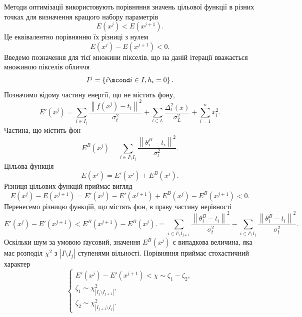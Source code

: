 Методи оптимізації використовують порівняння
значень цільової функції в різних точках
для визначення кращого набору параметрів
\begin{equation*}
  E\left( x^j \right) < E\left( x^{j+1} \right).
\end{equation*}
Це еквівалентно порівнянню їх різниці з нулем
\begin{equation*}
  E\left( x^j \right) - E\left( x^{j+1} \right) < 0.
\end{equation*}
Введемо позначення для тієї множини пікселів,
що на даній ітерації вважається множиною пікселів обличчя
\begin{equation*}
  I^j = \left\{ i \mcond i \in I, h_i = 0 \right\}.
\end{equation*}
Позначимо відому частину енергії, що не містить фону,
\begin{equation*}
  E'\left( x^j \right)
  = \sum_{i \in I_j} \frac{\left\| f\left( x^j \right) - t_i \right\|^2}{\sigma^2_t}
    + \sum_{l \in L} \frac{\Delta_l^2\left( x \right)}{\sigma_L^2}
    + \sum_{i = 1}^n x_i^2.
\end{equation*}
Частина, що містить фон
\begin{equation*}
  E^B\left( x^j \right)
  = \sum_{i \in I \setminus I_j} \frac{\left\| \theta_i^B - t_i \right\|^2}{\sigma^2_t}.
\end{equation*}
Цільова функція
\begin{equation*}
  E\left( x^j \right) = E'\left( x^j \right) + E^B\left( x^j \right).
\end{equation*}
Різниця цільових функцій приймає вигляд
\begin{equation*}
  E\left( x^j \right) - E\left( x^{j+1} \right)
  = E'\left( x^j \right) - E'\left( x^{j+1} \right)
    + E^B\left( x^j \right) - E^B\left( x^{j+1} \right)
  < 0.
\end{equation*}
Перенесемо різницю функцій, що містять фон, в праву частину нерівності
\begin{equation*}
  E'\left( x^j \right) - E'\left( x^{j+1} \right)
  < E^B\left( x^{j+1} \right) - E^B\left( x^j \right).
  = \sum_{i \in I \setminus I_{j+1}} \frac{\left\| \theta_i^B - t_i \right\|^2}{\sigma^2_t}
    - \sum_{i \in I \setminus I_j} \frac{\left\| \theta_i^B - t_i \right\|^2}{\sigma^2_t}.
\end{equation*}
Оскільки шум за умовою ґаусовий,
значення $E^B\left( x^j \right)$ є випадкова величина,
яка має розподіл $\chi^2$ з $\left| I \setminus I_j \right|$
ступенями вільності.
Порівняння приймає стохастичний характер
\begin{equation}\label{eq:background:comparison}
  \begin{cases}
    E'\left( x^j \right) - E'\left( x^{j+1} \right)
    < \chi \sim \zeta_1 - \zeta_2, \\
    \zeta_1 \sim \chi^2_{\left| I_j \setminus I_{j+1} \right|}, \\
    \zeta_2 \sim \chi^2_{\left| I_{j+1} \setminus I_j \right|}.
  \end{cases}
\end{equation}

